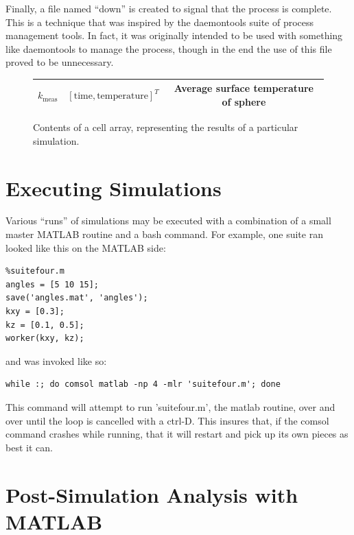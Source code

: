 Finally, a file named ``down'' is created to signal that the process is
complete. This is a technique that was inspired by the daemontools suite of
process management tools. In fact, it was originally intended to be used with
something like daemontools to manage the process, though in the end the use of this file proved
to be unnecessary.


\begin{figure}
\label{fig:cellarray}

\centering
\begin{tabular}{| c | c | c |}
\hline
\(k_\textrm{meas}\) & \( \left[ \textrm{time}, \textrm{temperature} \right]^T\) & Average surface temperature of sphere\\
\hline
\end{tabular}
\caption{Contents of a cell array, representing the results of a particular simulation.}
\end{figure}

\section{Executing Simulations}

Various ``runs'' of simulations may be executed with a combination of a
small master MATLAB routine and a bash command. For example, one suite ran
looked like this on the MATLAB side:

\small
\begin{verbatim}
%suitefour.m
angles = [5 10 15];
save('angles.mat', 'angles');
kxy = [0.3];
kz = [0.1, 0.5];
worker(kxy, kz);
\end{verbatim}
\normalsize 

and was invoked like so:

\small
\begin{verbatim}
while :; do comsol matlab -np 4 -mlr 'suitefour.m'; done
\end{verbatim}
\normalsize

This command will attempt to run 'suitefour.m', the matlab routine, over and over until the loop is cancelled with a
ctrl-D. This insures that, if the comsol command crashes while running,
that it will restart and pick up its own pieces as best it can.

\section{Post-Simulation Analysis with MATLAB}

